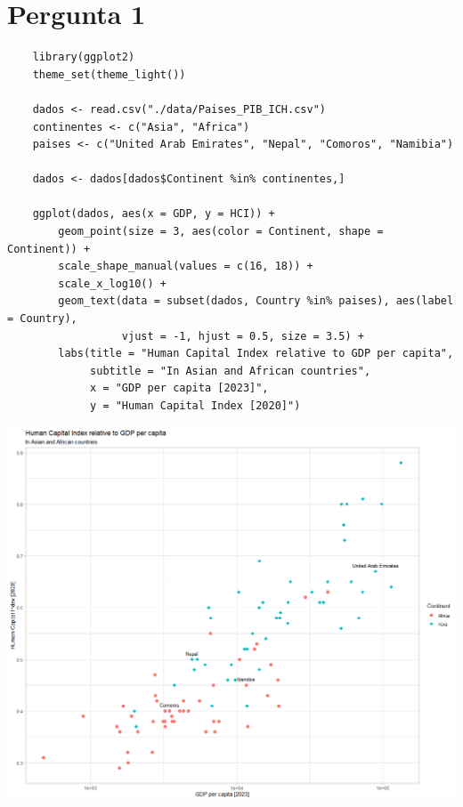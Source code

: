 \documentclass[11pt]{article}
\begin{document}
\section*{Pergunta 1}

\begin{lstlisting}
    library(ggplot2)
    theme_set(theme_light())

    dados <- read.csv("./data/Paises_PIB_ICH.csv")
    continentes <- c("Asia", "Africa")
    paises <- c("United Arab Emirates", "Nepal", "Comoros", "Namibia")

    dados <- dados[dados$Continent %in% continentes,]

    ggplot(dados, aes(x = GDP, y = HCI)) +
        geom_point(size = 3, aes(color = Continent, shape = Continent)) +
        scale_shape_manual(values = c(16, 18)) +
        scale_x_log10() +
        geom_text(data = subset(dados, Country %in% paises), aes(label = Country), 
                  vjust = -1, hjust = 0.5, size = 3.5) +
        labs(title = "Human Capital Index relative to GDP per capita",
             subtitle = "In Asian and African countries",
             x = "GDP per capita [2023]",
             y = "Human Capital Index [2020]")
\end{lstlisting}

\vspace{14pt}

\begin{center}
    \includegraphics[width=\linewidth]{pergunta_1.png}
\end{center}
\end{document}
